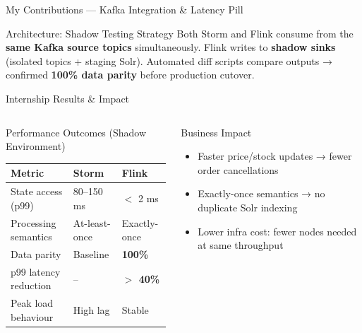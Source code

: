 \documentclass[aspectratio=169,xcolor=dvipsnames,10pt]{beamer}
\begin{document}
\begin{frame}{My Contributions --- Kafka Integration \& Latency Pill}
    \vspace{0.4em}
    \begin{alertblock}{Architecture: Shadow Testing Strategy}
        \centering\footnotesize
        Both Storm and Flink consume from the \textbf{same Kafka source topics} simultaneously.
        Flink writes to \textbf{shadow sinks} (isolated topics + staging Solr). Automated diff scripts compare outputs → confirmed \textbf{100\% data parity} before production cutover.
    \end{alertblock}
\end{frame}

\begin{frame}{Internship Results \& Impact}
    \begin{columns}[T]
        \begin{block}{Performance Outcomes (Shadow Environment)}
            \footnotesize
            \begin{tabular}{|p{3.2cm}|p{1.5cm}|p{1.5cm}|}
                \hline
                \textbf{Metric} & \textbf{Storm} & \textbf{Flink} \\
                \hline
                State access (p99) & 80--150 ms & $<$ 2 ms \\
                \hline
                Processing semantics & At-least-once & Exactly-once \\
                \hline
                Data parity & Baseline & \textbf{100\%} \\
                \hline
                p99 latency reduction & -- & \textbf{$>$ 40\%} \\
                \hline
                Peak load behaviour & High lag & Stable \\
                \hline
            \end{tabular}
        \end{block}

        \vspace{0.3em}
        \begin{exampleblock}{Business Impact}
            \footnotesize
            \begin{itemize}
                \item Faster price/stock updates → fewer order cancellations
                \item Exactly-once semantics → no duplicate Solr indexing
                \item Lower infra cost: fewer nodes needed at same throughput
            \end{itemize}
        \end{exampleblock}


\end{columns}
\end{frame}
\end{document}
